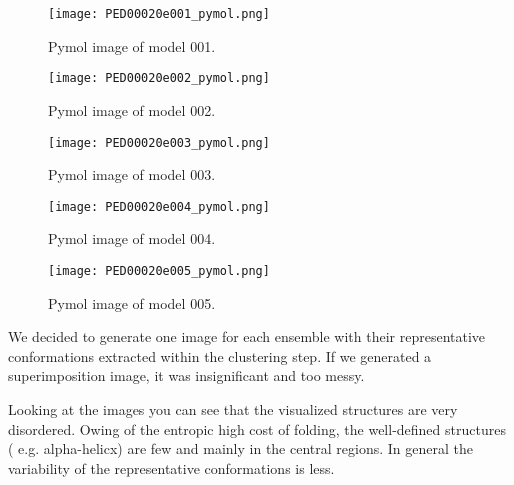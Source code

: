 \begin{figure}[H]
	\begin{minipage}[b]{0.97\textwidth}
		\centering
		\texttt{[image: PED00020e001\_pymol.png]}
		\caption{Pymol image of model 001.}
		\label{model001p}
	\end{minipage}
	\begin{minipage}[b]{0.97\textwidth}
		\centering
		\texttt{[image: PED00020e002\_pymol.png]}
		\caption{Pymol image of model 002.}
		\label{model002p}
	\end{minipage}
\end{figure}
\begin{figure}[H]
	\begin{minipage}[b]{0.99\textwidth}
		\centering
		\texttt{[image: PED00020e003\_pymol.png]}
		\caption{Pymol image of model 003.}
		\label{model003p}
	\end{minipage}
	\begin{minipage}[b]{0.99\textwidth}
		\centering
		\texttt{[image: PED00020e004\_pymol.png]}
		\caption{Pymol image of model 004.}
		\label{model004p}
	\end{minipage}
	\begin{minipage}[b]{0.99\textwidth}
		\centering
		\texttt{[image: PED00020e005\_pymol.png]}
		\caption{Pymol image of model 005.}
		\label{model005p}
	\end{minipage}
\end{figure}

\medskip
\medskip
\medskip
We decided to generate one image for each ensemble with their representative conformations extracted within the clustering step.
If we generated a superimposition image, it was insignificant and too messy.

Looking at the images you can see that the visualized structures are very disordered. Owing of the entropic high cost of folding, the well-defined structures ( e.g. alpha-helicx) are few and mainly in the central regions. In general the variability of the representative conformations is less.
